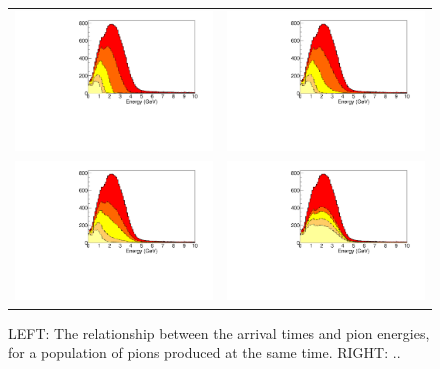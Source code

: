 \documentclass[preprint,12pt]{elsarticle}
\begin{document}
\begin{figure}[t]
	\begin{center}
           	\begin{tabular}{c c}	
           	\includegraphics[width=0.45 \linewidth]{Figures/10.10.18_LBNFtiming/DUNEbeam_truetimingB.pdf} &
			\includegraphics[width=0.45 \linewidth]{Figures/10.10.18_LBNFtiming/DUNEbeam_100psecB.pdf} \\
           	\includegraphics[width=0.45 \linewidth]{Figures/10.10.18_LBNFtiming/DUNEbeam_250psecB.pdf} &
			\includegraphics[width=0.45 \linewidth]{Figures/10.10.18_LBNFtiming/DUNEbeam_900psecB.pdf}
			 \\			
			\end{tabular}
	\end{center}
	\caption{LEFT: The relationship between the arrival times and pion energies, for a population of pions produced at the same time. RIGHT: ..}
		\label{fig:anniedetector}
\end{figure}
\end{document}
